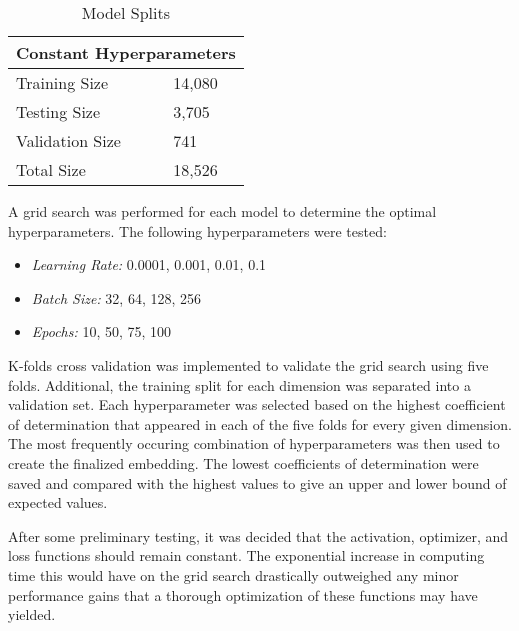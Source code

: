 \documentclass{article}
\begin{document}
\begin{table}[h!]
\begin{center}
    \caption{Model Splits}
    \label{tab:table1}
    \vspace{0.1cm}
    \begin{tabular}{p{4cm}p{7cm}}
        \hline
        \multicolumn{2}{c}{Constant Hyperparameters}\\
        \hline
        Training Size & 14,080\\
        Testing Size & 3,705\\
        Validation Size & 741\\
        Total Size & 18,526\\
        \hline
    \end{tabular}
\end{center}
\end{table}
\par A grid search was performed for each model to determine the optimal hyperparameters. The following hyperparameters were tested:
\begin{itemize}
    \item \textit{Learning Rate:} 0.0001, 0.001, 0.01, 0.1
    \item \textit{Batch Size:} 32, 64, 128, 256
    \item \textit{Epochs:} 10, 50, 75, 100
\end{itemize}
\par K-folds cross validation was implemented to validate the grid search using five folds. Additional, the training split for each dimension was separated into a validation set. Each hyperparameter was selected based on the highest coefficient of determination that appeared in each of the five folds for every given dimension. The most frequently occuring combination of hyperparameters was then used to create the finalized embedding. The lowest coefficients of determination were saved and compared with the highest values to give an upper and lower bound of expected values.
\par After some preliminary testing, it was decided that the activation, optimizer, and loss functions should remain constant. The exponential increase in computing time this would have on the grid search drastically outweighed any minor performance gains that a thorough optimization of these functions may have yielded.
\end{document}
